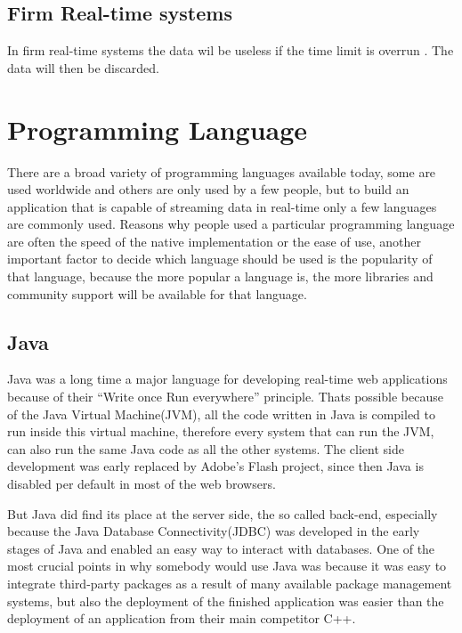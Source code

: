 \subsection{Firm Real-time systems}

In firm real-time systems the data wil be useless if the time limit is overrun \autocite{RealTimeHermannKopetz}. The data will then be discarded.

\author{Nico Leidenfrost}
%
\section{Programming Language}
There are a broad variety of programming languages available today, some are used worldwide and others are only used by a few people, but to build an application that is capable of streaming data in real-time only a few languages are commonly used. Reasons why people used a particular programming language are often the speed of the native implementation or the ease of use, another important factor to decide which language should be used is the popularity of that language, because the more popular a language is, the more libraries and community support will be available for that language.

\subsection{Java}
Java was a long time a major language for developing real-time web applications because of their ``Write once Run everywhere'' principle. Thats possible because of the Java Virtual Machine(JVM), all the code written in Java is compiled to run inside this virtual machine, therefore every system that can run the JVM, can also run the same Java code as all the other systems. The client side development was early replaced by Adobe's Flash project, since then Java is disabled per default in most of the web browsers.

But Java did find its place at the server side, the so called back-end, especially because the Java Database Connectivity(JDBC) was developed in the early stages of Java and enabled an easy way to interact with databases. One of the most crucial points in why somebody would use Java was because it was easy to integrate third-party packages as a result of many available package management systems, but also the deployment of the finished application was easier than the deployment of an application from their main competitor C++.

